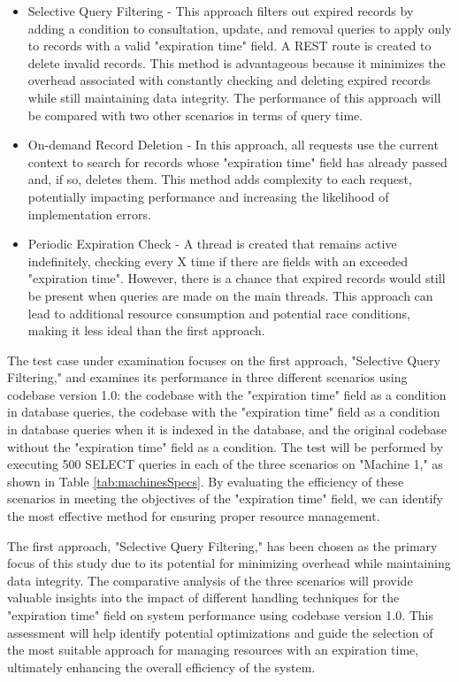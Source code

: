 \documentclass[a4paper,fleqn]{cas-dc}
\begin{document}
\begin{itemize}
	\item Selective Query Filtering - This approach filters out expired records by adding a condition to consultation, update, and removal queries to apply only to records with a valid "expiration time" field. A REST route is created to delete invalid records. This method is advantageous because it minimizes the overhead associated with constantly checking and deleting expired records while still maintaining data integrity. The performance of this approach will be compared with two other scenarios in terms of query time.
	\item On-demand Record Deletion - In this approach, all requests use the current context to search for records whose "expiration time" field has already passed and, if so, deletes them. This method adds complexity to each request, potentially impacting performance and increasing the likelihood of implementation errors.
	\item Periodic Expiration Check - A thread is created that remains active indefinitely, checking every X time if there are fields with an exceeded "expiration time". However, there is a chance that expired records would still be present when queries are made on the main threads. This approach can lead to additional resource consumption and potential race conditions, making it less ideal than the first approach.
\end{itemize}

The test case under examination focuses on the first approach, "Selective Query Filtering," and examines its performance in three different scenarios using codebase version 1.0: the codebase with the "expiration time" field as a condition in database queries, the codebase with the "expiration time" field as a condition in database queries when it is indexed in the database, and the original codebase without the "expiration time" field as a condition. The test will be performed by executing 500 SELECT queries in each of the three scenarios on "Machine 1," as shown in Table \ref{tab:machinesSpecs}. By evaluating the efficiency of these scenarios in meeting the objectives of the "expiration time" field, we can identify the most effective method for ensuring proper resource management.

The first approach, "Selective Query Filtering," has been chosen as the primary focus of this study due to its potential for minimizing overhead while maintaining data integrity. The comparative analysis of the three scenarios will provide valuable insights into the impact of different handling techniques for the "expiration time" field on system performance using codebase version 1.0. This assessment will help identify potential optimizations and guide the selection of the most suitable approach for managing resources with an expiration time, ultimately enhancing the overall efficiency of the system.
\end{document}
